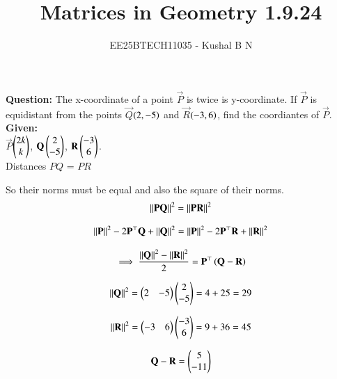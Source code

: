 \documentclass[journal,12pt,onecolumn]{IEEEtran}
\title{Matrices in Geometry 1.9.24}
\author{EE25BTECH11035 - Kushal B N}
\theoremstyle{remark}
\begin{document}
\vspace{3cm}
\maketitle
{\let\newpage\relax\maketitle}
\textbf{Question: }
The x-coordinate of a point $\vec{P}$ is twice is y-coordinate. If $\vec{P}$ is equidistant from the points $\vec{Q}$$\left(2,-5\right)$ and $\vec{R}$$\left(-3,6\right)$, find the coordiantes of $\vec{P}$.\\

\textbf{Given: } \\
$\vec{P}$$\begin{pmatrix}2k\\k\end{pmatrix}$, $\mathbf{Q}\begin{pmatrix}2\\-5\end{pmatrix}$, $\mathbf{R}\begin{pmatrix}-3\\6\end{pmatrix}$.\\
Distances $PQ$ = $PR$

So their norms must be equal and also the square of their norms.
\begin{equation}
{\left\lVert\mathbf{PQ}\right\rVert}^{2} = {\left\lVert\mathbf{PR}\right\rVert}^2
\end{equation}

\begin{equation}
    {\left\lVert\mathbf{P}\right\rVert}^2 - 2\mathbf{P}^{\top}\mathbf{Q} + {\left\lVert\mathbf{Q}\right\rVert}^2 = {\left\lVert\mathbf{P}\right\rVert}^2 - 2\mathbf{P}^{\top}\mathbf{R} + {\left\lVert\mathbf{R}\right\rVert}^2
\end{equation}

\begin{equation}
    \implies \frac{{\left\lVert\mathbf{Q}\right\rVert}^2 - {\left\lVert\mathbf{R}\right\rVert}^2}{2} = \mathbf{P}^{\top}\left(\mathbf{Q}-\mathbf{R}\right)
\end{equation}

\begin{equation*}
    {\left\lVert\mathbf{Q}\right\rVert}^2 = \begin{pmatrix}2&-5\end{pmatrix}\begin{pmatrix}2\\-5\end{pmatrix} = 4+25 = 29
\end{equation*}

\begin{equation*}
    {\left\lVert\mathbf{R}\right\rVert}^2 = \begin{pmatrix}-3&6\end{pmatrix}\begin{pmatrix}-3\\6\end{pmatrix} = 9+36 = 45
\end{equation*}

\begin{equation*}
    \mathbf{Q} - \mathbf{R} = \begin{pmatrix}5\\-11\end{pmatrix}
\end{equation*}
\end{document}
